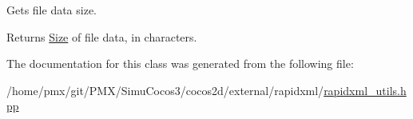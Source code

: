 Gets file data size. \begin{DoxyReturn}{Returns}
\hyperlink{classSize}{Size} of file data, in characters. 
\end{DoxyReturn}


The documentation for this class was generated from the following file\+:\begin{DoxyCompactItemize}
\item 
/home/pmx/git/\+P\+M\+X/\+Simu\+Cocos3/cocos2d/external/rapidxml/\hyperlink{rapidxml__utils_8hpp}{rapidxml\+\_\+utils.\+hpp}\end{DoxyCompactItemize}
